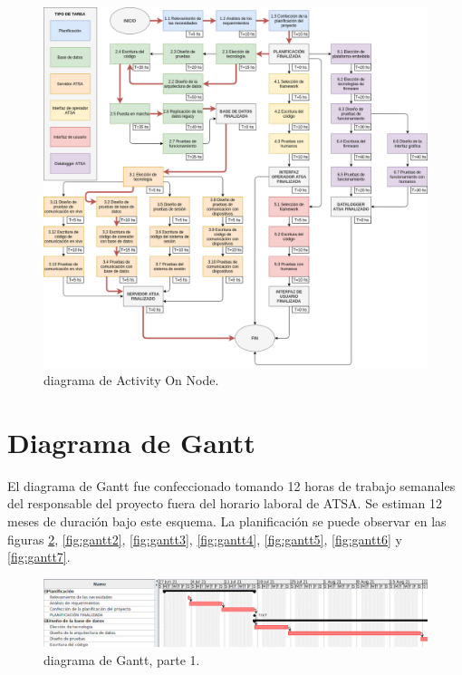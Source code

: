 \documentclass[
12pt,
spanish,
singlespacing,
parskip,
headsepline,]{article}
\begin{document}
\begin{figure}[H]
	\centering
	\includegraphics[width=\textwidth]{Figuras/ActivityOnNode.png}
	\caption{diagrama de Activity On Node.}
	\label{fig:activity}
\end{figure}

\section{Diagrama de Gantt}

El diagrama de Gantt fue confeccionado tomando 12 horas de trabajo semanales del responsable del proyecto fuera del horario laboral de ATSA.
Se estiman 12 meses de duración bajo este esquema.
La planificación se puede observar en las figuras \ref{fig:gantt1}, \ref{fig:gantt2}, \ref{fig:gantt3}, \ref{fig:gantt4}, \ref{fig:gantt5}, \ref{fig:gantt6} y \ref{fig:gantt7}.

\begin{figure}[H]
	\centering
	\includegraphics[width=\textwidth]{Figuras/gantt01.png}
	\caption{diagrama de Gantt, parte 1.}
	\label{fig:gantt1}
\end{figure}
\end{document}
